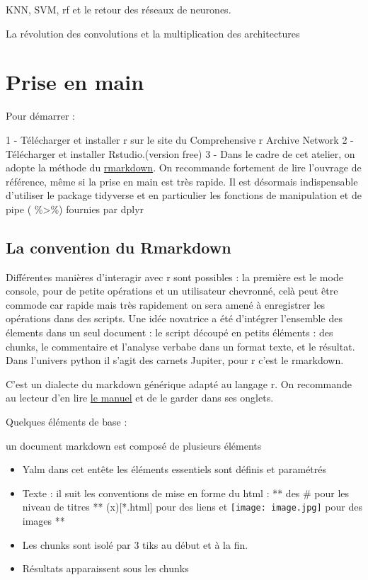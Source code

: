 \documentclass[
]{book}
\providecommand{\tightlist}{%
  \setlength{\itemsep}{0pt}\setlength{\parskip}{0pt}}
\begin{document}
KNN, SVM, rf et le retour des réseaux de neurones.

La révolution des convolutions et la multiplication des architectures

\hypertarget{prise-en-main}{%
\chapter{Prise en main}\label{prise-en-main}}

Pour démarrer :

1 - Télécharger et installer r sur le site du Comprehensive r Archive Network
2 - Télécharger et installer Rstudio.(version free)
3 - Dans le cadre de cet atelier, on adopte la méthode du \href{https://rmarkdown.rstudio.com/lesson-1.html}{rmarkdown}. On recommande fortement de lire l'ouvrage de référence, même si la prise en main est très rapide. Il est désormais indispensable d'utiliser le package tidyverse et en particulier les fonctions de manipulation et de pipe ( \%\textgreater\%) fournies par dplyr

\hypertarget{la-convention-du-rmarkdown}{%
\section{La convention du Rmarkdown}\label{la-convention-du-rmarkdown}}

Différentes manières d'interagir avec r sont possibles : la première est le mode console, pour de petite opérations et un utilisateur chevronné, celà peut être commode car rapide mais très rapidement on sera amené à enregistrer les opérations dans des scripts. Une idée novatrice a été d'intégrer l'ensemble des élements dans un seul document : le script découpé en petits éléments : des chunks, le commentaire et l'analyse verbabe dans un format texte, et le résultat. Dans l'univers python il s'agit des carnets Jupiter, pour r c'est le rmarkdown.

C'est un dialecte du markdown générique adapté au langage r. On recommande au lecteur d'en lire \href{https://bookdown.org/yihui/rmarkdown/}{le manuel} et de le garder dans ses onglets.

Quelques éléments de base :

un document markdown est composé de plusieurs éléments

\begin{itemize}
\tightlist
\item
  Yalm dans cet entête les éléments essentiels sont définis et paramétrés
\item
  Texte : il suit les conventions de mise en forme du html :
  ** des \# pour les niveau de titres
  ** (x){[}*.html{]} pour des liens et \texttt{[image: image.jpg]} pour des images
  **
\item
  Les chunks sont isolé par 3 tiks au début et à la fin.
\item
  Résultats apparaissent sous les chunks
\end{itemize}
\end{document}
